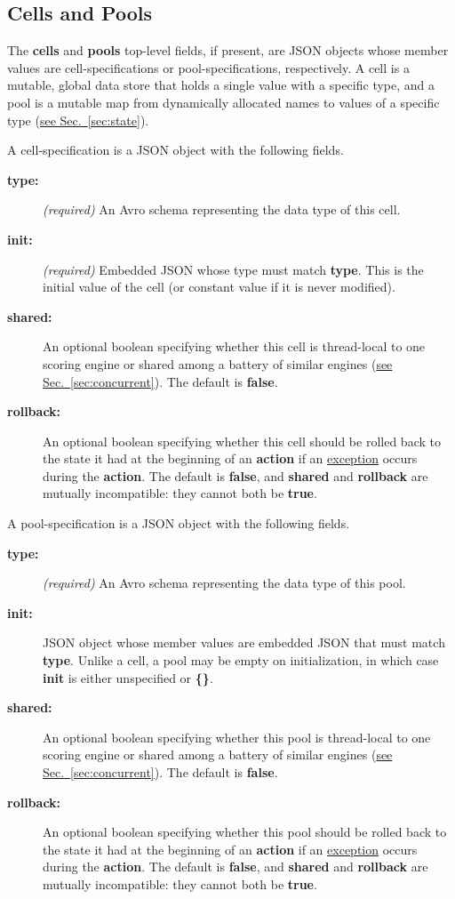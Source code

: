 \documentclass{article}
\newcommand{\PFAc}{\ttfamily\bfseries}
\newenvironment{allowedfields}%
  {\begin{center} \begin{minipage}{0.9\linewidth} \begin{description}}%
  {\end{description} \end{minipage} \end{center}}
\theoremstyle{definition}
\begin{document}
\hypertarget{hsec:cells-pools}{}
\subsection{Cells and Pools}
\label{sec:cells-pools}

The {\PFAc cells} and {\PFAc pools} top-level fields, if present, are JSON objects whose member values are cell-specifications or pool-specifications, respectively.  A cell is a mutable, global data store that holds a single value with a specific type, and a pool is a mutable map from dynamically allocated names to values of a specific type (\hyperlink{hsec:state}{see Sec.~\ref{sec:state}}).

A cell-specification is a JSON object with the following fields.
\begin{allowedfields}
\item[\PFAc type:] {\it (required)} An Avro schema representing the data type of this cell.
\item[\PFAc init:] {\it (required)} Embedded JSON whose type must match {\PFAc type}.  This is the initial value of the cell (or constant value if it is never modified).
\item[\PFAc shared:] An optional boolean specifying whether this cell is thread-local to one scoring engine or shared among a battery of similar engines (\hyperlink{hsec:concurrent}{see Sec.~\ref{sec:concurrent}}).  The default is {\PFAc false}.
\item[\PFAc rollback:] An optional boolean specifying whether this cell should be rolled back to the state it had at the beginning of an {\PFAc action} if an \hyperlink{hsec:exceptions}{exception} occurs during the {\PFAc action}.  The default is {\PFAc false}, and {\PFAc shared} and {\PFAc rollback} are mutually incompatible: they cannot both be {\PFAc true}.
\end{allowedfields}

A pool-specification is a JSON object with the following fields.
\begin{allowedfields}
\item[\PFAc type:] {\it (required)} An Avro schema representing the data type of this pool.
\item[\PFAc init:] JSON object whose member values are embedded JSON that must match {\PFAc type}.  Unlike a cell, a pool may be empty on initialization, in which case {\PFAc init} is either unspecified or {\PFAc \{\}}.
\item[\PFAc shared:] An optional boolean specifying whether this pool is thread-local to one scoring engine or shared among a battery of similar engines (\hyperlink{hsec:concurrent}{see Sec.~\ref{sec:concurrent}}).  The default is {\PFAc false}.
\item[\PFAc rollback:] An optional boolean specifying whether this pool should be rolled back to the state it had at the beginning of an {\PFAc action} if an \hyperlink{hsec:exceptions}{exception} occurs during the {\PFAc action}.  The default is {\PFAc false}, and {\PFAc shared} and {\PFAc rollback} are mutually incompatible: they cannot both be {\PFAc true}.
\end{allowedfields}
\end{document}
